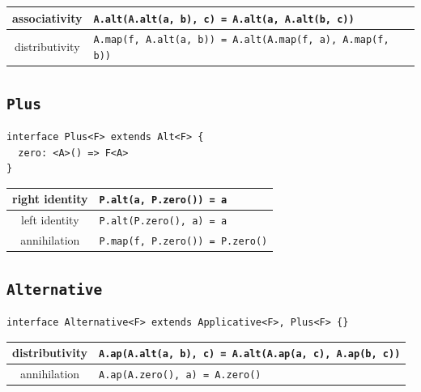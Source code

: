 \documentclass[12pt]{article}
\begin{document}
\begin{center}
\bgroup
\def\arraystretch{1.5}
\begin{tabular}{ |c|p{10cm}| }
\hline
associativity & \texttt{A.alt(A.alt(a, b), c) = A.alt(a, A.alt(b, c))} \\
\hline
distributivity & \texttt{A.map(f, A.alt(a, b)) = A.alt(A.map(f, a), A.map(f, b))} \\
\hline
\end{tabular}
\egroup
\end{center}

\subsection{\texttt{Plus}}

\begin{verbatim}
interface Plus<F> extends Alt<F> {
  zero: <A>() => F<A>
}
\end{verbatim}

\begin{center}
\bgroup
\def\arraystretch{1.5}
\begin{tabular}{ |c|p{10cm}| }
\hline
right identity & \texttt{P.alt(a, P.zero()) = a} \\
\hline
left identity & \texttt{P.alt(P.zero(), a) = a} \\
\hline
annihilation & \texttt{P.map(f, P.zero()) = P.zero()} \\
\hline
\end{tabular}
\egroup
\end{center}

\subsection{\texttt{Alternative}}

\begin{verbatim}
interface Alternative<F> extends Applicative<F>, Plus<F> {}
\end{verbatim}

\begin{center}
\bgroup
\def\arraystretch{1.5}
\begin{tabular}{ |c|p{10cm}| }
\hline
distributivity & \texttt{A.ap(A.alt(a, b), c) = A.alt(A.ap(a, c), A.ap(b, c))} \\
\hline
annihilation & \texttt{A.ap(A.zero(), a) = A.zero()} \\
\hline
\end{tabular}
\egroup
\end{center}
\end{document}
